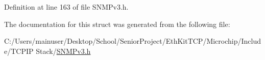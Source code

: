 Definition at line 163 of file S\+N\+M\+Pv3.\+h.



The documentation for this struct was generated from the following file\+:\begin{DoxyCompactItemize}
\item 
C\+:/\+Users/mainuser/\+Desktop/\+School/\+Senior\+Project/\+Eth\+Kit\+T\+C\+P/\+Microchip/\+Include/\+T\+C\+P\+I\+P Stack/\hyperlink{_s_n_m_pv3_8h}{S\+N\+M\+Pv3.\+h}\end{DoxyCompactItemize}
